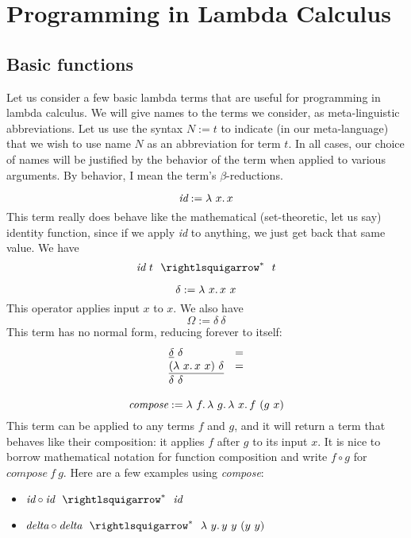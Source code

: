 \chapter{Programming in Lambda Calculus}
\label{ch:prog}

\section{Basic functions}
\label{sec:basicfuncs}

Let us consider a few basic lambda terms that are useful for
programming in lambda calculus.  We will give names to the terms we
consider, as meta-linguistic abbreviations.  Let us use the syntax $N
:= t$ to indicate (in our meta-language) that we wish to use name $N$
as an abbreviation for term $t$.  In all cases, our choice of names
will be justified by the behavior of the term when applied to various
arguments.  By behavior, I mean the term's $\beta$-reductions.

\[
\textit{id} := \lambda\ x.\, x
\]
\noindent This term really does behave like the mathematical
(set-theoretic, let us say) identity function, since if we apply
\textit{id} to anything, we just get back that same value.  We have
{\large
\[
\textit{id}\ t \ \ \betaa^* \ \ t
\]}

\[
\delta := \lambda\ x.\, x\ x
\]
\noindent This operator applies input $x$ to $x$. 
We also have
\[
\Omega := \delta\ \delta
\]
\noindent This term has no normal form, reducing forever to itself:
\[
\begin{array}{ll}
  \underline{\delta}\ \delta & = \\
  \underline{(\lambda\ x.\, x\ x)\ \delta} & = \\
  \delta\ \delta &\
\end{array}
\]

\[
\textit{compose} := \lambda\ f.\, \lambda\ g.\, \lambda\ x.\, f\ (g\ x)
\]
\noindent This term can be applied to any terms $f$ and $g$, and it
will return a term that behaves like their composition: it applies $f$
after $g$ to its input $x$.  It is nice to borrow mathematical notation for
function composition and write $f \circ g$ for $\textit{compose}\ f\ g$.
Here are a few examples using \textit{compose}:
\begin{itemize}
\item $\textit{id} \circ \textit{id} \ \ \betaa^*\ \ \textit{id}$
  \item $\textit{delta}\circ \textit{delta} \ \ \betaa^*\ \ \lam{y}{y\ y\ (y\ y)}$
\end{itemize}

